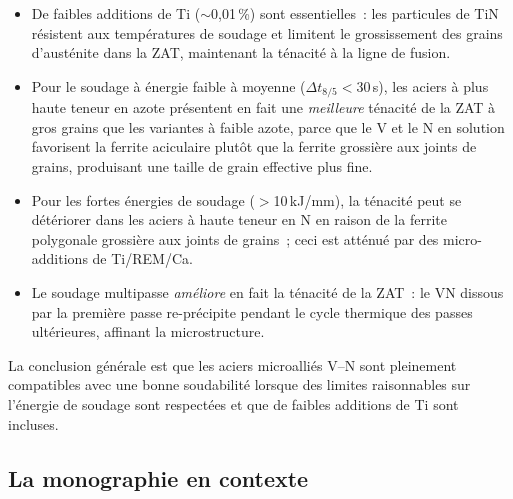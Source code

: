 \documentclass[11pt,a4paper]{article}
\begin{document}
\begin{itemize}
  \item De faibles additions de Ti ($\sim$0,01\,\%) sont essentielles~:
    les particules de TiN r\'esistent aux temp\'eratures de soudage et
    limitent le grossissement des grains d'aust\'enite dans la ZAT,
    maintenant la t\'enacit\'e \`a la ligne de fusion.
  \item Pour le soudage \`a \'energie faible \`a moyenne
    ($\Delta t_{8/5} < 30$\,s), les aciers \`a plus haute teneur en azote
    pr\'esentent en fait une \emph{meilleure} t\'enacit\'e de la ZAT
    \`a gros grains que les variantes \`a faible azote, parce que le V et
    le N en solution favorisent la ferrite aciculaire plut\^ot que la
    ferrite grossi\`ere aux joints de grains, produisant une taille de
    grain effective plus fine.
  \item Pour les fortes \'energies de soudage ($>$10\,kJ/mm), la
    t\'enacit\'e peut se d\'et\'eriorer dans les aciers \`a haute teneur
    en N en raison de la ferrite polygonale grossi\`ere aux joints de
    grains~; ceci est att\'enu\'e par des micro-additions de Ti/REM/Ca.
  \item Le soudage multipasse \emph{am\'eliore} en fait la t\'enacit\'e
    de la ZAT~: le VN dissous par la premi\`ere passe re-pr\'ecipite
    pendant le cycle thermique des passes ult\'erieures, affinant la
    microstructure.
\end{itemize}

La conclusion g\'en\'erale est que les aciers microalli\'es V--N sont
pleinement compatibles avec une bonne soudabilit\'e lorsque des limites
raisonnables sur l'\'energie de soudage sont respect\'ees et que de
faibles additions de Ti sont incluses.

\subsection{La monographie en contexte}
\end{document}
